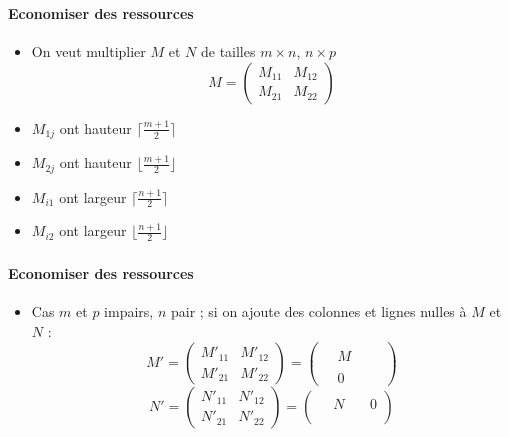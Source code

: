 \documentclass{beamer}
\begin{document}
\begin{frame}
  \frametitle{\insertsubsection}
  \framesubtitle{Economiser des ressources}
  \begin{itemize}
    \item On veut multiplier
    $M$ et $N$ de tailles $m\times n$, $n \times p$
    $$M=\begin{pmatrix}
      M_{11} & M_{12} \\
      M_{21} & M_{22}
    \end{pmatrix}$$
    \item $M_{1j}$ ont hauteur $\lceil \frac{m+1}{2} \rceil$
    \item $M_{2j}$ ont hauteur $\lfloor \frac{m+1}{2} \rfloor$
    \item $M_{i1}$ ont largeur $\lceil \frac{n+1}{2} \rceil$
    \item $M_{i2}$ ont largeur $\lfloor \frac{n+1}{2} \rfloor$
  \end{itemize}
\end{frame}

\begin{frame}
  \frametitle{\insertsubsection}
  \framesubtitle{Economiser des ressources}
  \begin{itemize}
    \item Cas $m$ et $p$ impairs, $n$ pair ;
    si on ajoute des colonnes et lignes nulles à $M$ et $N$ :
    $$M'
    =\begin{pmatrix}
      M'_{11} & M'_{12} \\
      M'_{21} & M'_{22}
    \end{pmatrix}
    =\left(\begin{array}{cccc}
      ~ & ~ & ~ & ~ \\
      ~ & M & ~ & ~ \\
      ~ & ~ & ~ & ~ \\
      \hline
      ~ & 0 & ~ & ~
    \end{array}\right)$$
  $$N'
    =\begin{pmatrix}
      N'_{11} & N'_{12} \\
      N'_{21} & N'_{22}
    \end{pmatrix}
    =\left(\begin{array}{ccc|c}
      ~ & ~ & ~ & ~ \\
      ~ & N & ~ & 0 \\
      ~ & ~ & ~ & ~ \\
      ~ & ~ & ~ & ~
    \end{array}\right)$$
  \end{itemize}
\end{frame}
\end{document}
